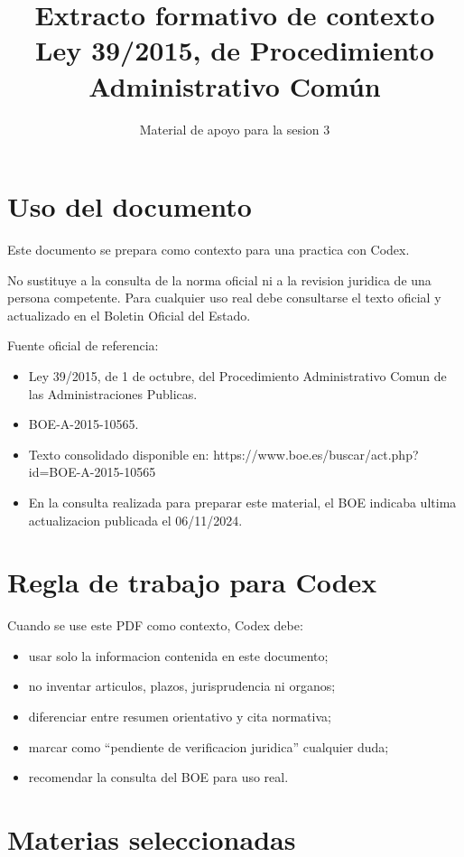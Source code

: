 \documentclass[a4paper,12pt]{article}
\title{Extracto formativo de contexto\\Ley 39/2015, de Procedimiento Administrativo Común}
\author{Material de apoyo para la sesion 3}
\date{}
\begin{document}
\maketitle

\section*{Uso del documento}

Este documento se prepara como contexto para una practica con Codex.

No sustituye a la consulta de la norma oficial ni a la revision juridica de una persona competente. Para cualquier uso real debe consultarse el texto oficial y actualizado en el Boletin Oficial del Estado.

Fuente oficial de referencia:

\begin{itemize}
    \item Ley 39/2015, de 1 de octubre, del Procedimiento Administrativo Comun de las Administraciones Publicas.
    \item BOE-A-2015-10565.
    \item Texto consolidado disponible en: https://www.boe.es/buscar/act.php?id=BOE-A-2015-10565
    \item En la consulta realizada para preparar este material, el BOE indicaba ultima actualizacion publicada el 06/11/2024.
\end{itemize}

\section*{Regla de trabajo para Codex}

Cuando se use este PDF como contexto, Codex debe:

\begin{itemize}
    \item usar solo la informacion contenida en este documento;
    \item no inventar articulos, plazos, jurisprudencia ni organos;
    \item diferenciar entre resumen orientativo y cita normativa;
    \item marcar como ``pendiente de verificacion juridica'' cualquier duda;
    \item recomendar la consulta del BOE para uso real.
\end{itemize}

\section*{Materias seleccionadas}
\end{document}

